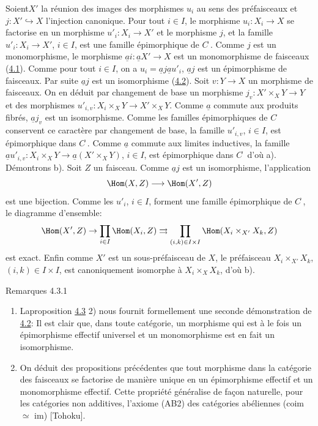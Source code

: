 Soient\pageoriginale $X'$ la réunion des images des morphismes
$u_i$ au sens des préfaisceaux et $j:X'\hookrightarrow X$
l'injection canonique. Pour tout $i\in I$, le morphisme
$u_i:X_i\rightarrow X$ se factorise en un morphisme
$u'_i:X_i\rightarrow X'$ et le morphisme $j$, et la famille
$u'_i:X_i\rightarrow X'$, $i\in I$, est une famille épimorphique
de $C^{\widehat{\phantom{,}}}$. Comme $j$ est un monomorphisme, le
morphisme $\underline{a}i:\underline{a}X'\rightarrow X$ est un monomorphisme
de faisceaux (\hyperref[II.theo4.1]{4.1}). Comme pour tout $i\in I$, on a
$u_i=\underline{a}j\underline{a}u'_i$, $\underline{a}j$ est un épimorphisme de
faisceaux. Par suite $\underline{a}j$ est un isomorphisme
(\hyperref[II.prop4.2]{4.2}). Soit $v:Y\rightarrow X$ un morphisme de
faisceaux. On en déduit par changement de base un morphisme
$j_v:X'\times_X Y\rightarrow Y$ et des morphismes
$u'_{i,v}:X_i\times_X Y\rightarrow X'\times_X Y$. Comme $\underline{a}$
commute aux produits fibrés, $\underline{a}j_v$ est un isomorphisme.
Comme les familles épimorphiques de $C^{\widehat{\phantom{,}}}$
conservent ce caractère par changement de base, la famille
$u'_{i,v}$, $i\in I$, est épimorphique dans
$C^{\widehat{\phantom{,}}}$. Comme $\underline{a}$ commute aux limites
inductives, la famille $\underline{a}u'_{i,v}:X_i\times_X Y\rightarrow
\underline{a}(X'\times_X Y)$, $i\in I$, est épimorphique dans
$C^{\widetilde{\phantom{,}}}$ d'où a). Démontrons b). Soit $Z$
un faisceau. Comme $\underline{a}j$ est un isomorphisme, l'application
$$
\Hom(X,Z)\longrightarrow \Hom(X',Z)
$$
est une bijection. Comme les $u'_i$, $i\in I$, forment une famille
épimorphique de $C^{\widehat{\phantom{,}}}$, le diagramme
d'ensemble:
$$
\Hom(X',Z)\rightarrow \prod_{i\in I} \Hom(X_i,Z)\rightrightarrows
\prod_{(i,k)\in I\times I}\Hom(X_i\times_{X'}X_k, Z)
$$
est exact. Enfin comme $X'$ est un sous-préfaisceau de $X$, le
préfaisceau $X_i\times_{X'}X_k$, $(i,k)\in I\times I$, est
canoniquement isomorphe à $X_i\times_X X_k$, d'où b).

\begin{enonce*}[remark]{Remarques 4.3.1}
\begin{enumerate}
\renewcommand{\labelenumi}{\theenumi)}
\item La\pageoriginale proposition \hyperref[II.prop4.3]{4.3} 2) nous fournit
  formellement
  une seconde démonstration de \hyperref[II.prop4.2]{4.2}: Il est clair que,
  dans toute
  catégorie, un morphisme qui est à le fois un épimorphisme
  effectif universel et un monomorphisme est en fait un isomorphisme.

\item On déduit des propositions précédentes que tout morphisme
  dans la catégorie des faisceaux se factorise de manière unique
  en un épimorphisme effectif et un monomorphisme effectif. Cette
  propriété généralise de façon naturelle, pour les
  catégories non additives, l'axiome (AB2) des catégories
  abéliennes (coim $\simeq$ im) [Tohoku].
\end{enumerate}
\end{enonce*}

